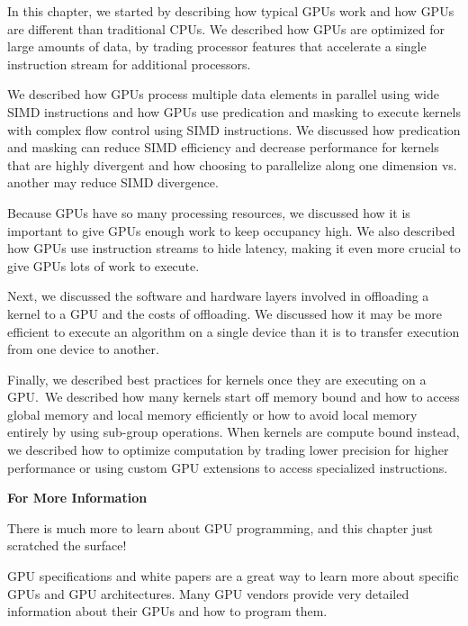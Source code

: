 
In this chapter, we started by describing how typical GPUs work and how GPUs are different than traditional CPUs. We described how GPUs are optimized for large amounts of data, by trading processor features that accelerate a single instruction stream for additional processors.\par

We described how GPUs process multiple data elements in parallel using wide SIMD instructions and how GPUs use predication and masking to execute kernels with complex flow control using SIMD instructions. We discussed how predication and masking can reduce SIMD efficiency and decrease performance for kernels that are highly divergent and how choosing to parallelize along one dimension vs. another may reduce SIMD divergence.\par

Because GPUs have so many processing resources, we discussed how it is important to give GPUs enough work to keep occupancy high. We also described how GPUs use instruction streams to hide latency, making it even more crucial to give GPUs lots of work to execute.\par

Next, we discussed the software and hardware layers involved in offloading a kernel to a GPU and the costs of offloading. We discussed how it may be more efficient to execute an algorithm on a single device than it is to transfer execution from one device to another.\par

Finally, we described best practices for kernels once they are executing on a GPU. We described how many kernels start off memory bound and how to access global memory and local memory efficiently or how to avoid local memory entirely by using sub-group operations. When kernels are compute bound instead, we described how to optimize computation by trading lower precision for higher performance or using custom GPU extensions to access specialized instructions.\par

\hspace*{\fill} \par %
\textbf{For More Information}

There is much more to learn about GPU programming, and this chapter just scratched the surface!\par

GPU specifications and white papers are a great way to learn more about specific GPUs and GPU architectures. Many GPU vendors provide very detailed information about their GPUs and how to program them.\par

